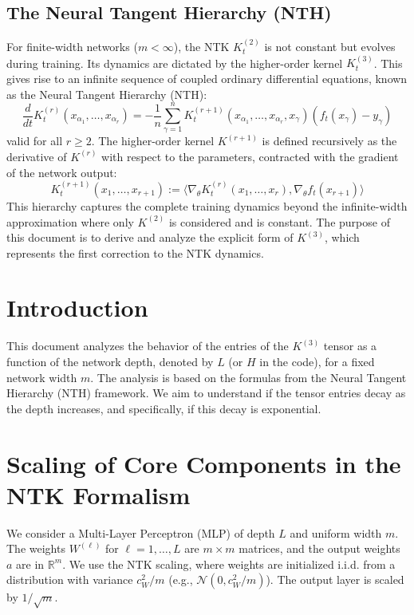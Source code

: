 \documentclass[11pt,a4paper]{article}
\begin{document}
\subsection{The Neural Tangent Hierarchy (NTH)}
For finite-width networks ($m < \infty$), the NTK $K^{(2)}_t$ is not constant but evolves during training. Its dynamics are dictated by the higher-order kernel $K^{(3)}_t$. This gives rise to an infinite sequence of coupled ordinary differential equations, known as the Neural Tangent Hierarchy (NTH):
\begin{equation}
\frac{d}{dt} K^{(r)}_t(x_{\alpha_1}, \dots, x_{\alpha_r}) = -\frac{1}{n} \sum_{\gamma=1}^n K^{(r+1)}_t(x_{\alpha_1}, \dots, x_{\alpha_r}, x_\gamma) (f_t(x_\gamma) - y_\gamma)
\end{equation}
valid for all $r \ge 2$. The higher-order kernel $K^{(r+1)}$ is defined recursively as the derivative of $K^{(r)}$ with respect to the parameters, contracted with the gradient of the network output:
\begin{equation}
K^{(r+1)}_t(x_1, \dots, x_{r+1}) := \langle \nabla_\theta K^{(r)}_t(x_1, \dots, x_r), \nabla_\theta f_t(x_{r+1}) \rangle
\end{equation}
This hierarchy captures the complete training dynamics beyond the infinite-width approximation where only $K^{(2)}$ is considered and is constant. The purpose of this document is to derive and analyze the explicit form of $K^{(3)}$, which represents the first correction to the NTK dynamics.

\section{Introduction}

This document analyzes the behavior of the entries of the $K^{(3)}$ tensor as a function of the network depth, denoted by $L$ (or $H$ in the code), for a fixed network width $m$. The analysis is based on the formulas from the Neural Tangent Hierarchy (NTH) framework. We aim to understand if the tensor entries decay as the depth increases, and specifically, if this decay is exponential.

\section{Scaling of Core Components in the NTK Formalism}

We consider a Multi-Layer Perceptron (MLP) of depth $L$ and uniform width $m$. The weights $W^{(\ell)}$ for $\ell=1, \dots, L$ are $m \times m$ matrices, and the output weights $a$ are in $\mathbb{R}^m$. We use the NTK scaling, where weights are initialized i.i.d. from a distribution with variance $c_W^2/m$ (e.g., $\mathcal{N}(0, c_W^2/m)$). The output layer is scaled by $1/\sqrt{m}$.
\end{document}
